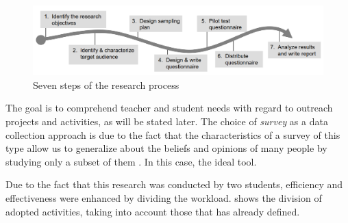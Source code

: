 
\begin{figure}[htb]
  \caption{Seven steps of the research process}\label{fig:setepassos}
  \begin{center}
    \includegraphics[width=16cm]{img/5-kasunic-process.png}
  \end{center}
\end{figure}


The goal is to comprehend teacher and student needs with regard to outreach projects and activities, as will be stated later.
The choice of \textit{survey} as a data collection approach is due to the fact that the characteristics of a survey of this type allow us to generalize about the beliefs and opinions of many people by studying only a subset of them \cite{kasunic2005designing}.
In this case, the ideal tool.


Due to the fact that this research was conducted by two students, efficiency and effectiveness were enhanced by dividing the workload.
 shows the division of adopted activities, taking into account those that \textcite{kasunic2005designing} has already defined.


